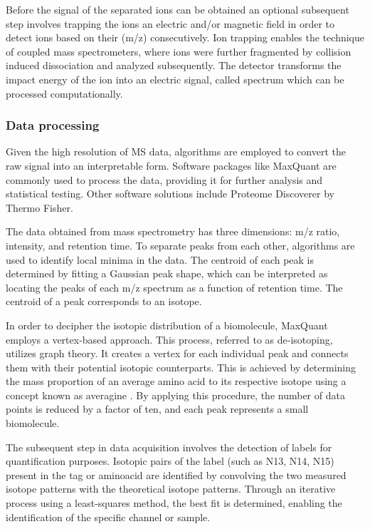 \documentclass[
  11pt,
]{article}
\begin{document}
Before the signal of the separated ions can be obtained an optional
subsequent step involves trapping the ions an electric and/or magnetic
field in order to detect ions based on their (m/z) consecutively. Ion
trapping enables the technique of coupled mass spectrometers, where ions
were further fragmented by collision induced dissociation and analyzed
subsequently. The detector transforms the impact energy of the ion into
an electric signal, called spectrum which can be processed
computationally.

\hypertarget{data-processing}{%
\subsubsection{Data processing}\label{data-processing}}

Given the high resolution of MS data, algorithms are employed to convert
the raw signal into an interpretable form. Software packages like
MaxQuant \citep{Cox2008} are commonly used to process the data,
providing it for further analysis and statistical testing. Other
software solutions include Proteome Discoverer by Thermo Fisher.

The data obtained from mass spectrometry has three dimensions: m/z
ratio, intensity, and retention time. To separate peaks from each other,
algorithms are used to identify local minima in the data. The centroid
of each peak is determined by fitting a Gaussian peak shape, which can
be interpreted as locating the peaks of each m/z spectrum as a function
of retention time. The centroid of a peak corresponds to an isotope.

In order to decipher the isotopic distribution of a biomolecule,
MaxQuant employs a vertex-based approach. This process, referred to as
de-isotoping, utilizes graph theory. It creates a vertex for each
individual peak and connects them with their potential isotopic
counterparts. This is achieved by determining the mass proportion of an
average amino acid to its respective isotope using a concept known as
averagine \citep{Senko1995}. By applying this procedure, the number of
data points is reduced by a factor of ten, and each peak represents a
small biomolecule.

The subsequent step in data acquisition involves the detection of labels
for quantification purposes. Isotopic pairs of the label (such as N13,
N14, N15) present in the tag or aminoacid are identified by convolving
the two measured isotope patterns with the theoretical isotope patterns.
Through an iterative process using a least-squares method, the best fit
is determined, enabling the identification of the specific channel or
sample.
\end{document}
